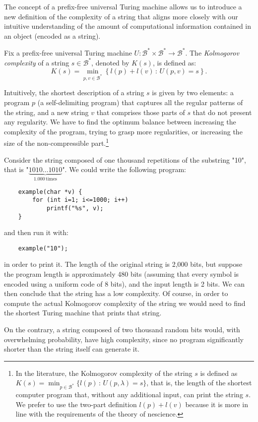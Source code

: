 The concept of a prefix-free universal Turing machine allows us to introduce a new definition of the complexity of a string that aligns more closely with our intuitive understanding of the amount of computational information contained in an object (encoded as a string).

\begin{definition}
\label{def:Kolmogorov-Complexity}
Fix a prefix-free universal Turing machine $U:\mathcal{B}^\ast \times \mathcal{B}^\ast \rightarrow \mathcal{B}^\ast$. The \emph{Kolmogorov complexity} of a string $s \in \mathcal{B}^\ast$, denoted by $K(s)$, is defined as:
\[
K(s)=\min_{p,v \in \mathcal{B}^\ast}\left\{l(p) + l(v)\,:\, U(p,v)=s\right\}.
\]
\end{definition}

Intuitively, the shortest description of a string $s$ is given by two elements: a program $p$ (a self-delimiting program) that captures all the regular patterns of the string, and a new string $v$ that comprises those parts of $s$ that do not present any regularity. We have to find the optimum balance between increasing the complexity of the program, trying to grasp more regularities, or increasing the size of the non-compressible part.\footnote{In the literature, the Kolmogorov complexity of the string $s$ is defined as $K(s)=\min_{p \in \mathcal{B}^\ast}\{l(p)\,:\, U(p,\lambda)=s\}$, that is, the length of the shortest computer program that, without any additional input, can print the string $s$. We prefer to use the two-part definition $l(p) + l(v)$ because it is more in line with the requirements of the theory of nescience.}

\begin{example}
Consider the string composed of one thousand repetitions of the substring "10", that is "$\underbrace{1010\ldots1010}_{1.000\,\mathrm{times}}$". We could write the following program:

\begin{verbatim}
    example(char *v) {
        for (int i=1; i<=1000; i++)
            printf("%s", v);
    }
\end{verbatim}
and then run it with:
\begin{verbatim}
    example("10");
\end{verbatim}

in order to print it. The length of the original string is 2,000 bits, but suppose the program length is approximately 480 bits (assuming that every symbol is encoded using a uniform code of 8 bits), and the input length is 2 bits. We can then conclude that the string has a low complexity. Of course, in order to compute the actual Kolmogorov complexity of the string we would need to find the shortest Turing machine that prints that string.

On the contrary, a string composed of two thousand random bits would, with overwhelming probability, have high complexity, since no program significantly shorter than the string itself can generate it.
\end{example}

